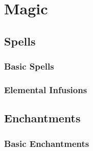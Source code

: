 
\part{Magic}

\chapter{Spells}
\section{Basic Spells}
\section{Elemental Infusions}

\chapter{Enchantments}
\section{Basic Enchantments}

